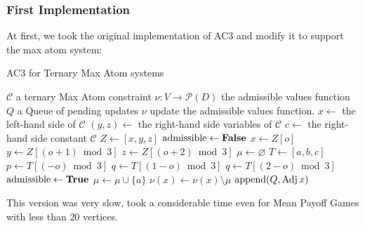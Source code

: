 \subsubsection{First Implementation}
At first, we took the original implementation of AC3 \cite[page.~171]{AIModernApproach} and modify it to support the max atom system:
\begin{algorithm}
	\caption{AC3 for Ternary Max Atom systems}\label{alg:AC3}
	\begin{algorithmic}
		\Require $\mathcal{C}$ a ternary Max Atom constraint
		\Require $\nu:V\rightarrow \mathscr{P}(D)$ the admissible values function
		\Require $Q$ a Queue of pending updates
		\Ensure $\nu$ update the admissible values function.
		\State	$x\leftarrow$ the left-hand side of $\mathcal{C}$
		\State	$(y,z)\leftarrow$ the right-hand side variables of $\mathcal{C}$
		\State	$c\leftarrow$ the right-hand side constant $\mathcal{C}$
		\State $Z\leftarrow [x,y,z]$
		 
			\State $\text{admissible}\leftarrow \operatorname{\textbf{False}}$
			\State $x\leftarrow Z[o]$
			\State $y\leftarrow Z[(o+1)\bmod 3]$
			\State $z\leftarrow Z[(o+2)\bmod 3]$
			\State $\mu\leftarrow \varnothing$ 
					\State $T\leftarrow[a,b,c]$
					\State $p\leftarrow T[(-o)\bmod 3]$
					\State $q\leftarrow T[(1-o)\bmod 3]$
					\State $q\leftarrow T[(2-o)\bmod 3]$
						\State $\text{admissible}\leftarrow \operatorname{\textbf{True}}$
					\EndIf
				\EndFor
					\State $\mu\leftarrow \mu \cup \{a\}$
				\EndIf
			\EndFor
				\State $\nu(x)\leftarrow \nu(x)\setminus \mu$
				\State $\text{append}(Q,\operatorname{Adj} x)$
			\EndIf

		\EndFor
	\end{algorithmic}
\end{algorithm}
\FloatBarrier
This version was very slow, took a considerable time even for Mean Payoff Games with less than $20$ vertices.

